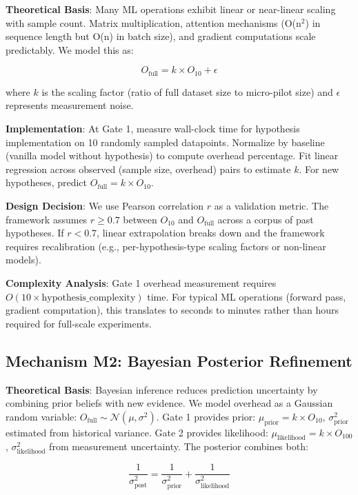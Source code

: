 \textbf{Theoretical Basis}: Many ML operations exhibit linear or near-linear scaling with sample count. Matrix multiplication, attention mechanisms (O(n$^2$) in sequence length but O(n) in batch size), and gradient computations scale predictably. We model this as:

\begin{equation}
O_{\text{full}} = k \times O_{10} + \epsilon
\end{equation}

where $k$ is the scaling factor (ratio of full dataset size to micro-pilot size) and $\epsilon$ represents measurement noise.

\textbf{Implementation}: At Gate 1, measure wall-clock time for hypothesis implementation on 10 randomly sampled datapoints. Normalize by baseline (vanilla model without hypothesis) to compute overhead percentage. Fit linear regression across observed (sample size, overhead) pairs to estimate $k$. For new hypotheses, predict $O_{\text{full}} = k \times O_{10}$.

\textbf{Design Decision}: We use Pearson correlation $r$ as a validation metric. The framework assumes $r \geq 0.7$ between $O_{10}$ and $O_{\text{full}}$ across a corpus of past hypotheses. If $r < 0.7$, linear extrapolation breaks down and the framework requires recalibration (e.g., per-hypothesis-type scaling factors or non-linear models).

\textbf{Complexity Analysis}: Gate 1 overhead measurement requires $O(10 \times \text{hypothesis\_complexity})$ time. For typical ML operations (forward pass, gradient computation), this translates to seconds to minutes rather than hours required for full-scale experiments.

\subsection{Mechanism M2: Bayesian Posterior Refinement}

\textbf{Theoretical Basis}: Bayesian inference reduces prediction uncertainty by combining prior beliefs with new evidence. We model overhead as a Gaussian random variable: $O_{\text{full}} \sim \mathcal{N}(\mu, \sigma^2)$. Gate 1 provides prior: $\mu_{\text{prior}} = k \times O_{10}$, $\sigma^2_{\text{prior}}$ estimated from historical variance. Gate 2 provides likelihood: $\mu_{\text{likelihood}} = k \times O_{100}$, $\sigma^2_{\text{likelihood}}$ from measurement uncertainty. The posterior combines both:

\begin{equation}
\frac{1}{\sigma^2_{\text{post}}} = \frac{1}{\sigma^2_{\text{prior}}} + \frac{1}{\sigma^2_{\text{likelihood}}}
\end{equation}

